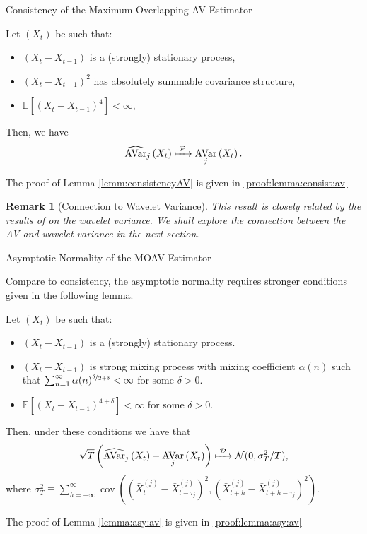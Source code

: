 \documentclass[envcountsect,usenames,dvipsnames]{beamer}
\DeclareMathOperator{\AV}{AVar}
\DeclareMathOperator*{\cov}{cov}
\theoremstyle{mystyle}
\newtheorem{Remark}{Remark}
\begin{document}
\begin{frame}{Consistency of the Maximum-Overlapping AV Estimator}
\small

\begin{Lemma}[Consistency]
\label{lemm:consistencyAV}
Let $(X_t)$ be such that:
\begin{itemize}
    \item $(X_t - X_{t-1})$ is a (strongly) stationary process,
    \item $(X_t - X_{t-1})^2$ has absolutely summable covariance structure,
    \item $\mathbb{E}\left[(X_t - X_{t-1})^4\right] < \infty$,
\end{itemize}
Then, we have
     $$\widehat{\AV}_j \left(X_t \right) \xmapsto[\;\;\;\;\; ]{\mathcal{P}} \AV_j \left(X_t \right).$$
\end{Lemma}

The proof of Lemma \ref{lemm:consistencyAV} is given in \ref{proof:lemma:consist:av} $\;$ \hyperlink{proof:lemma:consist:av}{}

\begin{Remark}[Connection to Wavelet Variance]
This result is closely related by the results of \cite{percival1995estimation} on the wavelet variance. We shall explore the connection between the AV and wavelet variance in the next section.
\end{Remark}
\end{frame}  

\begin{frame}{Asymptotic Normality of the MOAV Estimator}
\footnotesize

Compare to consistency, the asymptotic normality requires stronger conditions given in the following lemma.

\begin{Lemma}
\label{lemma:asy:av}
Let $(X_t)$ be such that:
\begin{itemize}
    \item $(X_t - X_{t-1})$ is a (strongly) stationary process.
    \item $(X_t - X_{t-1})$ is strong mixing process with mixing coefficient $\alpha(n)$ such that $\sum_{n=1}^{\infty} \alpha(n)^{\nicefrac{\delta}{2+\delta}} < \infty$ for some $\delta > 0$.
    \item $\mathbb{E}\left[\left(X_t - X_{t-1}\right)^{4+\delta}\right] < \infty$ for some $\delta > 0$.
\end{itemize}
    Then, under these conditions we have that $$\sqrt{T}\left(\widehat{\AV}_j \left(X_t \right) - \AV_j \left(X_t \right) \right) \xmapsto[\;\;\;\;\; ]{\mathcal{D}} \mathcal{N}(0, \sigma^2_T/T),$$ where $\sigma^2_T \equiv \sum_{h = -\infty}^{\infty}\cov\left( \left(\bar{X}_{t}^{(j)} - \bar{X}_{t-\tau_j}^{(j)} \right)^2, \left(\bar{X}_{t+h}^{(j)} - \bar{X}_{t+h-\tau_j}^{(j)} \right)^2 \right)$.
\end{Lemma}
    
    The proof of Lemma \ref{lemma:asy:av} is given in \ref{proof:lemma:asy:av} $\;$ \hyperlink{proof:lemma:asy:av}{}
\end{frame}
\end{document}
